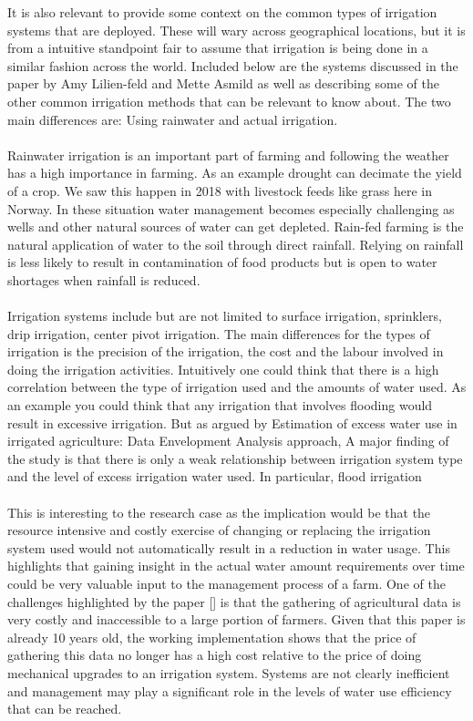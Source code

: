\documentclass[]{uiophd}
\begin{document}
It is also relevant to provide some context on the common types of irrigation systems that are deployed. These will wary across geographical locations, but it is from a intuitive standpoint fair to assume that irrigation is being done in a similar fashion across the world. Included below are the systems discussed in the paper by  Amy Lilien-feld and Mette Asmild as well as describing some of the  other common irrigation methods that can be relevant to know about. The two main differences are: Using rainwater and actual irrigation. 
\\\\
Rainwater irrigation is an important part of farming and following the weather has a high importance in farming. As an example drought can decimate the yield of a crop. We saw this happen in 2018 with livestock feeds like grass here in Norway. In these situation water management becomes especially challenging as wells and other natural sources of water can get depleted. Rain-fed farming is the natural application of water to the soil through direct rainfall. Relying on rainfall is less likely to result in contamination of food products but is open to water shortages when rainfall is reduced. \cite{cdc}
\\\\
Irrigation systems include but are not limited to surface irrigation, sprinklers, drip irrigation, center pivot irrigation. The main differences for the types of irrigation is the precision of the irrigation, the cost and the labour involved in doing the irrigation activities. Intuitively one could think that there is a high correlation between the type of irrigation used and the amounts of water used. As an example you could think that any irrigation that involves flooding would result in excessive irrigation. But as argued by Estimation of excess water use in irrigated agriculture: Data Envelopment Analysis approach, A major finding of the study is that there is only a weak relationship between irrigation system type and the level of excess irrigation water used. In particular, flood irrigation \cite{LILIENFELD200773}
\\\\
This is interesting to the research case as the implication would be that the resource intensive and costly exercise of changing or replacing the irrigation system used would not automatically result in a reduction in water usage. This highlights that gaining insight in the actual water amount requirements over time could be very valuable input to the management process of a farm. One of  the challenges highlighted by the paper [] is that the gathering of agricultural data is very costly and inaccessible to a large portion of farmers. Given that this paper is already 10 years old, the working implementation shows that the price of gathering this data no longer has a high cost relative to the price of doing mechanical upgrades to an irrigation system. Systems are not clearly inefficient and management may play a significant role in the levels of water use efficiency that can be reached. \cite{LILIENFELD200773}
\end{document}
